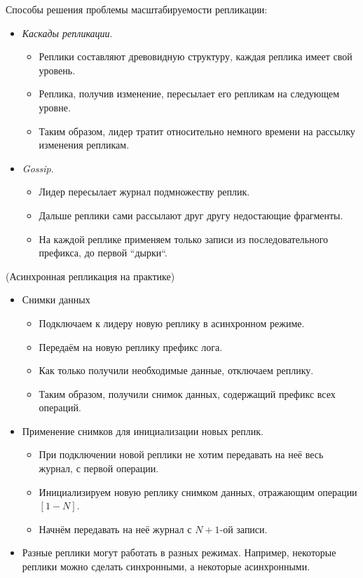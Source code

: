 Способы решения проблемы масштабируемости репликации:
\begin{itemize}
    \item \textit{Каскады репликации}.
    \begin{itemize}
        \item Реплики составляют древовидную структуру, каждая реплика имеет свой уровень.
        \item Реплика, получив изменение, пересылает его репликам на следующем уровне.
        \item Таким образом, лидер тратит относительно немного времени на рассылку изменения репликам.
    \end{itemize}

    \item \textit{Gossip}.
    \begin{itemize}
        \item Лидер пересылает журнал подмножеству реплик.
        \item Дальше реплики сами рассылают друг другу недостающие фрагменты.
        \item На каждой реплике применяем только записи из последовательного префикса, до первой ``дырки``.
    \end{itemize}
\end{itemize}

\begin{example}(Асинхронная репликация на практике)
    \begin{itemize}
        \item Снимки данных
        \begin{itemize}
            \item Подключаем к лидеру новую реплику в асинхронном режиме.
            \item Передаём на новую реплику префикс лога.
            \item Как только получили необходимые данные, отключаем реплику.
            \item Таким образом, получили снимок данных, содержащий префикс всех операций.
        \end{itemize}

        \item Применение снимков для инициализации новых реплик.
        \begin{itemize}
            \item При подключении новой реплики не хотим передавать на неё весь журнал, с первой операции.
            \item Инициализируем новую реплику снимком данных, отражающим операции $[1-N]$.
            \item Начнём передавать на неё журнал с $N+1$-ой записи.
        \end{itemize}

        \item Разные реплики могут работать в разных режимах. Например, некоторые реплики можно сделать синхронными, а некоторые асинхронными.

    \end{itemize}

\end{example}

